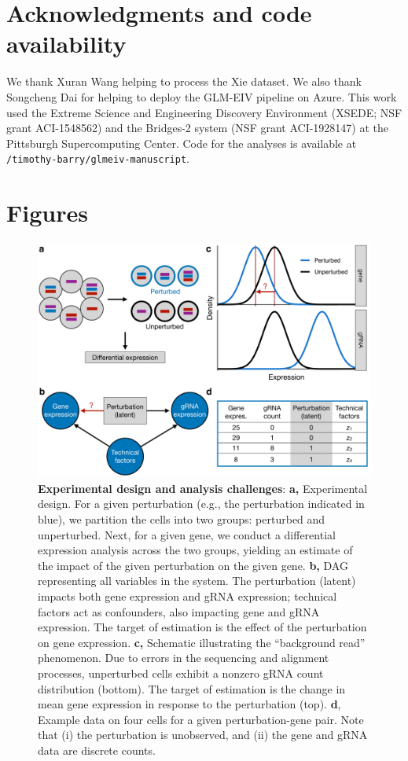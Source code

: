 \documentclass[11pt]{article}
\begin{document}
\section{Acknowledgments and code availability}
We thank Xuran Wang helping to process the Xie dataset. We also thank Songcheng Dai for helping to deploy the GLM-EIV pipeline on Azure. This work used the Extreme Science and Engineering Discovery Environment (XSEDE; NSF grant ACI-1548562) and the Bridges-2 system (NSF grant ACI-1928147) at the Pittsburgh Supercomputing Center. Code for the analyses is available at \texttt{/timothy-barry/glmeiv-manuscript}.

\printbibliography

\clearpage
\section*{Figures}
\begin{figure}[h!]
	\centering
	\includegraphics[width=1\linewidth]{../../figures/analysis_challenges/plot.pdf}
	\caption{\textbf{Experimental design and analysis challenges}: \textbf{a,} Experimental design. For a given perturbation (e.g., the perturbation indicated in blue), we partition the cells into two groups: perturbed and unperturbed. Next, for a given gene, we conduct a differential expression analysis across the two groups, yielding an estimate of the impact of the given perturbation on the given gene. \textbf{b,} DAG representing all variables in the system. The perturbation (latent) impacts both gene expression and gRNA expression; technical factors act as confounders, also impacting gene and gRNA expression. The target of estimation is the effect of the perturbation on gene expression. \textbf{c,} Schematic illustrating the ``background read'' phenomenon. Due to errors in the sequencing and alignment processes, unperturbed cells exhibit a nonzero gRNA count distribution (bottom). The target of estimation is the change in mean gene expression in response to the perturbation (top). \textbf{d}, Example data on four cells for a given perturbation-gene pair. Note that (i) the perturbation is unobserved, and (ii) the gene and gRNA data are discrete counts.}
	\label{analysis_challenges}
\end{figure}
\end{document}
